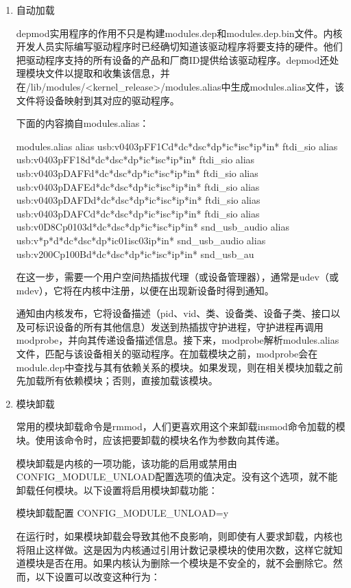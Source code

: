 \documentclass[lang=cn,newtx,10pt,scheme=chinese]{elegantbook}
\begin{document}
\begin{enumerate}
    \item 自动加载
    
    depmod实用程序的作用不只是构建modules.dep和modules.dep.bin文件。内核开发人员实际编写驱动程序时已经确切知道该驱动程序将要支持的硬件。他们把驱动程序支持的所有设备的产品和厂商ID提供给该驱动程序。depmod还处理模块文件以提取和收集该信息，并在/lib/modules/<kernel\_release>/modules.alias中生成modules.alias文件，该文件将设备映射到其对应的驱动程序。

    下面的内容摘自modules.alias：

    \begin{mycode}{modules.alias}
        alias usb:v0403pFF1Cd*dc*dsc*dp*ic*isc*ip*in* ftdi_sio
        alias usb:v0403pFF18d*dc*dsc*dp*ic*isc*ip*in* ftdi_sio
        alias usb:v0403pDAFFd*dc*dsc*dp*ic*isc*ip*in* ftdi_sio
        alias usb:v0403pDAFEd*dc*dsc*dp*ic*isc*ip*in* ftdi_sio
        alias usb:v0403pDAFDd*dc*dsc*dp*ic*isc*ip*in* ftdi_sio
        alias usb:v0403pDAFCd*dc*dsc*dp*ic*isc*ip*in* ftdi_sio
        alias usb:v0D8Cp0103d*dc*dsc*dp*ic*isc*ip*in* snd_usb_audio
        alias usb:v*p*d*dc*dsc*dp*ic01isc03ip*in* snd_usb_audio
        alias usb:v200Cp100Bd*dc*dsc*dp*ic*isc*ip*in* snd_usb_au
    \end{mycode}

    在这一步，需要一个用户空间热插拔代理（或设备管理器），通常是udev（或mdev），它将在内核中注册，以便在出现新设备时得到通知。
    
    通知由内核发布，它将设备描述（pid、vid、类、设备类、设备子类、接口以及可标识设备的所有其他信息）发送到热插拔守护进程，守护进程再调用modprobe，并向其传递设备描述信息。接下来，modprobe解析modules.alias文件，匹配与该设备相关的驱动程序。在加载模块之前，modprobe会在module.dep中查找与其有依赖关系的模块。如果发现，则在相关模块加载之前先加载所有依赖模块；否则，直接加载该模块。

    \item 模块卸载
    
    常用的模块卸载命令是rmmod，人们更喜欢用这个来卸载insmod命令加载的模块。使用该命令时，应该把要卸载的模块名作为参数向其传递。
    
    模块卸载是内核的一项功能，该功能的启用或禁用由CONFIG\_MODULE\_UNLOAD配置选项的值决定。没有这个选项，就不能卸载任何模块。以下设置将启用模块卸载功能：

    \begin{mycode}{模块卸载配置}
        CONFIG_MODULE_UNLOAD=y
    \end{mycode}

    在运行时，如果模块卸载会导致其他不良影响，则即使有人要求卸载，内核也将阻止这样做。这是因为内核通过引用计数记录模块的使用次数，这样它就知道模块是否在用。如果内核认为删除一个模块是不安全的，就不会删除它。然而，以下设置可以改变这种行为：


\end{enumerate}
\end{document}
